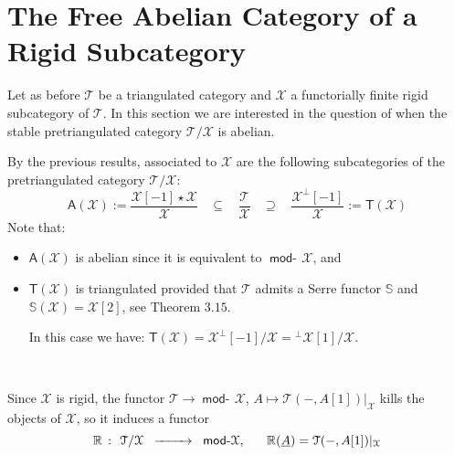 \documentclass[oneside, a4paper,reqno]{amsart}
\numberwithin{equation}{section}
\theoremstyle{definition}
\begin{document}
\section{The Free Abelian Category of a Rigid Subcategory}  

Let as before ${\mathcal T}$ be a triangulated category and ${\mathcal X}$ a functorially finite rigid subcategory of ${\mathcal T}$. In this section we are interested in the question of when the stable pretriangulated category ${\mathcal T}/{\mathcal X}$ is abelian. 

By the previous results, associated to ${\mathcal X}$ are  the following subcategories of the pretriangulated category ${\mathcal T}/{\mathcal X}$:
\[
\mathsf{A}({\mathcal X}) := \frac{{\mathcal X}[-1]\star {\mathcal X}}{\mathcal X} \,\,\,\,\ \subseteq \,\,\,\,\ \frac{\mathcal T}{\mathcal X} \,\,\,\,\ \supseteq \,\,\,\,\  \frac{{\mathcal X}^{\bot}[-1]}{\mathcal X}  := \mathsf{T}({\mathcal X}) 
 \] 
 Note that:
 \begin{itemize}
 \item $\mathsf{A}({\mathcal X})$ is abelian since it is equivalent to $\operatorname*{\mathsf{mod}-\!}{\mathcal X}$,  and
 \item $\mathsf{T}({\mathcal X})$ is triangulated provided that ${\mathcal T}$ admits a Serre functor $\mathbb S$ and $\mathbb S({\mathcal X}) = {\mathcal X}[2]$, see  Theorem $3.15$. 
 
 In this case we have: $\mathsf{T}({\mathcal X}) = {\mathcal X}^{\bot}[-1]/{\mathcal X} = {^{\bot}}{\mathcal X}[1]/{\mathcal X}$. 
 \end{itemize}
 
 \,
  

Since ${\mathcal X}$ is rigid, the functor ${\mathcal T} {\longrightarrow} \operatorname*{\mathsf{mod}-\!}{\mathcal X}$, $A \longmapsto {\mathcal T}(-,A[1])|_{\mathcal X}$ kills the objects of ${\mathcal X}$, so it induces a  functor  
\[
\begin{CD}
\mathbb{R} \ \colon \ {\mathcal T}/{\mathcal X} \ @> >> \ \operatorname*{\mathsf{mod}-\!}{\mathcal X}, \ \ \ \ \ \mathbb{R}(\underline{A}) = {\mathcal T}(-,A[1])|_{\mathcal X}
\end{CD}
\] 

\, 
\end{document}
